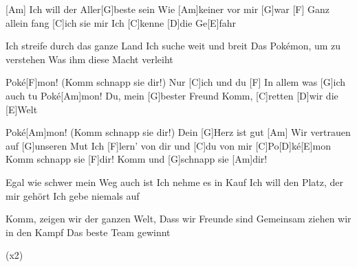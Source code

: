 

\begin{guitar}
	[Am] Ich will der Aller[G]beste sein
	Wie [Am]keiner vor mir [G]war
	[F] Ganz allein fang [C]ich sie mir
	Ich [C]kenne [D]die Ge[E]fahr
	
	Ich streife durch das ganze Land
	Ich suche weit und breit
	Das Pokémon, um zu verstehen
	Was ihm diese Macht verleiht
	
	Poké[F]mon! (Komm schnapp sie dir!) Nur [C]ich und du
	[F] In allem was [G]ich auch tu
	Poké[Am]mon! Du, mein [G]bester Freund
	Komm, [C]retten [D]wir die [E]Welt
	
	Poké[Am]mon! (Komm schnapp sie dir!) Dein [G]Herz ist gut
	[Am] Wir vertrauen auf [G]unseren Mut
	Ich [F]lern' von dir und [C]du von mir
	[C]Po[D]ké[E]mon
	Komm schnapp sie [F]dir! Komm und [G]schnapp sie [Am]dir!
	
	Egal wie schwer mein Weg auch ist
	Ich nehme es in Kauf
	Ich will den Platz, der mir gehört
	Ich gebe niemals auf
	
	Komm, zeigen wir der ganzen Welt,
	Dass wir Freunde sind
	Gemeinsam ziehen wir in den Kampf
	Das beste Team gewinnt
	
	  (x2)
\end{guitar}
